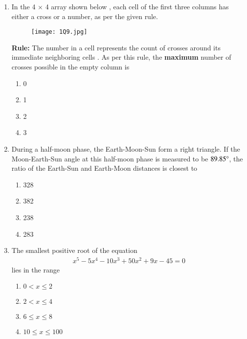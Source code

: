\documentclass[journal,12pt,onecolumn]{article}
\theoremstyle{remark}
\begin{document}
\begin{enumerate}
    \item In the 4 $\times$ 4 array shown below , each cell of the first three columns has either a cross  or a number, as per the given rule.
    \begin{figure}[H]
        \centering
        \texttt{[image: 1Q9.jpg]}
        \caption{}
        \label{fig:q9}
    \end{figure}
    \textbf{Rule:} The number in a cell represents the count of crosses around its immediate neighboring cells .
    As per this rule, the \textbf{maximum} number of crosses possible in the empty column is

    \hfill{}
    \begin{enumerate}
        \item 0
        \item 1
        \item 2
        \item 3
    \end{enumerate}

    \item During a half-moon phase, the Earth-Moon-Sun form a right triangle. If the Moon-Earth-Sun angle at this half-moon phase is measured to be $89.85\degree$, the ratio of the Earth-Sun and Earth-Moon distances is closest to

    \hfill{}
    \begin{enumerate}
        \item 328
        \item 382
        \item 238
        \item 283
    \end{enumerate}

    \item The smallest positive root of the equation
    \begin{align}
    x^5 - 5x^4 - 10x^3 + 50x^2 + 9x - 45 = 0
    \end{align}
    lies in the range

    \hfill{}
    \begin{enumerate}
        \item $0 < x \le 2$
        \item $2 < x \le 4$
        \item $6 \le x \le 8$
        \item $10 \le x \le 100$
    \end{enumerate}


\end{enumerate}
\end{document}
